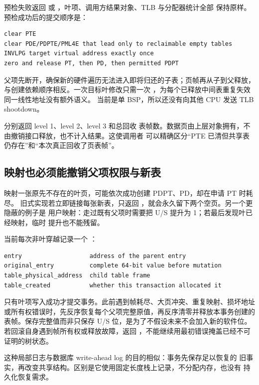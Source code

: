 预检失败返回  或
，叶项、调用方结果对象、TLB 与分配器统计全部
保持原样。预检成功后的提交顺序是：

\begin{verbatim}
clear PTE
clear PDE/PDPTE/PML4E that lead only to reclaimable empty tables
INVLPG target virtual address exactly once
zero and release PT, then PD, then permitted PDPT
\end{verbatim}

父项先断开，确保新的硬件遍历无法进入即将归还的子表；页帧再从子到父释放，
与创建依赖顺序相反。一次目标叶修改只需一次
，为每个已释放中间表重复失效同一线性地址没有额外语义。
当前是单 BSP，所以还没有向其他 CPU 发送 TLB shootdown。

 分别返回 level 1、level 2、level 3 和总回收
表帧数。数据页由上层对象拥有，不由撤销接口释放，也不计入结果。这使调用者
可以精确区分“PTE 已清但共享表仍存在”和“本次真正回收了页表帧”。

\subsection{映射也必须能撤销父项权限与新表}

映射一张原先不存在的叶页，可能依次成功创建 PDPT、PD，却在申请 PT 时耗尽。
旧式实现若立即链接每张新表，只返回
，就会永久留下两个空页。另一个更隐蔽的例子是
用户映射：走过既有父项时需要把 U/S 提升为 1；若最后发现叶已经映射，临时
提升也不能残留。

当前每次非叶穿越记录一个 ：

\begin{verbatim}
entry                   address of the parent entry
original_entry          complete 64-bit value before mutation
table_physical_address  child table frame
table_created           whether this transaction allocated it
\end{verbatim}

只有叶项写入成功才提交事务。此前遇到帧耗尽、大页冲突、重复映射、损坏地址
或所有权错误时，先反序恢复每个父项完整原值，再反序清零并释放本事务创建的
表帧。保存完整值而非只保存 U/S 位，是为了不假设未来不会加入新的软件位。
若回滚自身遇到帧所有权或释放故障，返回
，不能继续用最初错误掩盖已经不可证明的树状态。

这种局部日志与数据库 write-ahead log 的目的相似：事务先保存足以恢复的
旧事实，再改变共享结构。区别是它使用固定长度栈上记录，不分配内存，也没有
持久化恢复需求。

